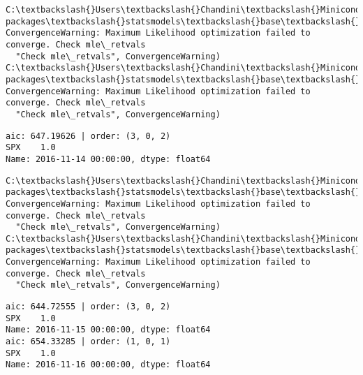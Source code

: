 \documentclass[11pt]{article}
\begin{document}
    \begin{Verbatim}[commandchars=\\\{\}]
C:\textbackslash{}Users\textbackslash{}Chandini\textbackslash{}Miniconda3\textbackslash{}envs\textbackslash{}auquan\textbackslash{}lib\textbackslash{}site-packages\textbackslash{}statsmodels\textbackslash{}base\textbackslash{}model.py:496: ConvergenceWarning: Maximum Likelihood optimization failed to converge. Check mle\_retvals
  "Check mle\_retvals", ConvergenceWarning)
C:\textbackslash{}Users\textbackslash{}Chandini\textbackslash{}Miniconda3\textbackslash{}envs\textbackslash{}auquan\textbackslash{}lib\textbackslash{}site-packages\textbackslash{}statsmodels\textbackslash{}base\textbackslash{}model.py:496: ConvergenceWarning: Maximum Likelihood optimization failed to converge. Check mle\_retvals
  "Check mle\_retvals", ConvergenceWarning)

    \end{Verbatim}

    \begin{Verbatim}[commandchars=\\\{\}]
aic: 647.19626 | order: (3, 0, 2)
SPX    1.0
Name: 2016-11-14 00:00:00, dtype: float64

    \end{Verbatim}

    \begin{Verbatim}[commandchars=\\\{\}]
C:\textbackslash{}Users\textbackslash{}Chandini\textbackslash{}Miniconda3\textbackslash{}envs\textbackslash{}auquan\textbackslash{}lib\textbackslash{}site-packages\textbackslash{}statsmodels\textbackslash{}base\textbackslash{}model.py:496: ConvergenceWarning: Maximum Likelihood optimization failed to converge. Check mle\_retvals
  "Check mle\_retvals", ConvergenceWarning)
C:\textbackslash{}Users\textbackslash{}Chandini\textbackslash{}Miniconda3\textbackslash{}envs\textbackslash{}auquan\textbackslash{}lib\textbackslash{}site-packages\textbackslash{}statsmodels\textbackslash{}base\textbackslash{}model.py:496: ConvergenceWarning: Maximum Likelihood optimization failed to converge. Check mle\_retvals
  "Check mle\_retvals", ConvergenceWarning)

    \end{Verbatim}

    \begin{Verbatim}[commandchars=\\\{\}]
aic: 644.72555 | order: (3, 0, 2)
SPX    1.0
Name: 2016-11-15 00:00:00, dtype: float64
aic: 654.33285 | order: (1, 0, 1)
SPX    1.0
Name: 2016-11-16 00:00:00, dtype: float64

    \end{Verbatim}
\end{document}
